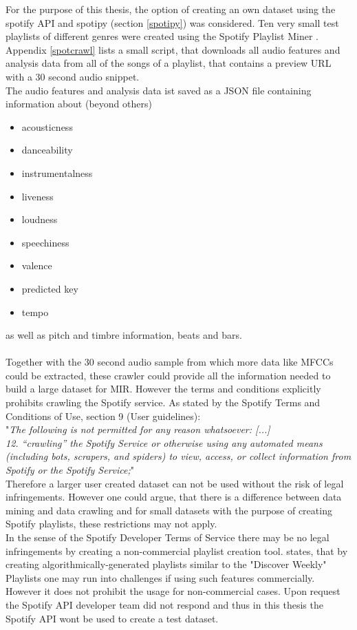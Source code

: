 For the purpose of this thesis, the option of creating an own dataset using the spotify API and spotipy (section \ref{spotipy}) was considered. 
Ten very small test playlists of different genres were created using the Spotify Playlist Miner \cite{spotmin1}. 
Appendix \ref{spotcrawl} lists a small script, that downloads all audio features and analysis data from all of the songs of a playlist, that contains a preview URL with a 30 second audio snippet.\\
The audio features and analysis data ist saved as a JSON file containing information about (beyond others)

\begin{itemize}
	\setlength\itemsep{0em}
	\item acousticness
	\item danceability
	\item instrumentalness
	\item liveness
	\item loudness
	\item speechiness
	\item valence
	\item predicted key
	\item tempo 
\end{itemize}

as well as pitch and timbre information, beats and bars.\\
\ \\
Together with the 30 second audio sample from which more data like MFCCs could be extracted, these crawler could provide all the information needed to build a large dataset for MIR. However the terms and conditions explicitly prohibits crawling the Spotify service. As stated by the Spotify Terms and Conditions of Use, section 9 (User guidelines):\\
"\textit{The following is not permitted for any reason whatsoever: [...]\\
12. “crawling” the Spotify Service or otherwise using any automated means (including bots, scrapers, and spiders) to view, access, or collect information from Spotify or the Spotify Service;}" \cite{spottac1}\\
Therefore a larger user created dataset can not be used without the risk of legal infringements. However one could argue, that there is a difference between data mining and data crawling and for small datasets with the purpose of creating Spotify playlists, these restrictions may not apply.\\ 
In the sense of the Spotify Developer Terms of Service \cite{spottac2} there may be no legal infringements by creating a non-commercial playlist creation tool. \cite{spottac3} states, that by creating algorithmically-generated playlists similar to the "Discover Weekly" Playlists one may run into challenges if using such features commercially. 
However it does not prohibit the usage for non-commercial cases.  
Upon request the Spotify API developer team did not respond and thus in this thesis the Spotify API wont be used to create a test dataset.
